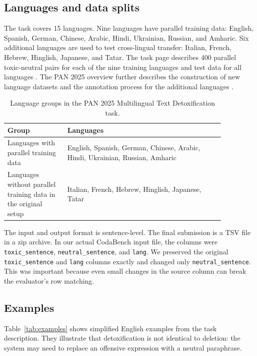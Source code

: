 \documentclass{article}
\begin{document}
\subsection{Languages and data splits}

The task covers 15 languages. Nine languages have parallel training data: English, Spanish, German, Chinese, Arabic, Hindi, Ukrainian, Russian, and Amharic. Six additional languages are used to test cross-lingual transfer: Italian, French, Hebrew, Hinglish, Japanese, and Tatar. The task page describes 400 parallel toxic-neutral pairs for each of the nine training languages and test data for all languages \cite{pan25taskpage}. The PAN 2025 overview further describes the construction of new language datasets and the annotation process for the additional languages \cite{dementieva2025pantextdetox}.

\begin{table}[tbh!]
\centering
\begin{tabular}{p{0.24\linewidth}p{0.63\linewidth}}
\toprule
Group & Languages \\
\midrule
Languages with parallel training data & English, Spanish, German, Chinese, Arabic, Hindi, Ukrainian, Russian, Amharic \\
Languages without parallel training data in the original setup & Italian, French, Hebrew, Hinglish, Japanese, Tatar \\
\bottomrule
\end{tabular}
\caption{Language groups in the PAN 2025 Multilingual Text Detoxification task.}
\label{tab:languages}
\end{table}

The input and output format is sentence-level. The final submission is a TSV file in a zip archive. In our actual CodaBench input file, the columns were \texttt{toxic\_sentence}, \texttt{neutral\_sentence}, and \texttt{lang}. We preserved the original \texttt{toxic\_sentence} and \texttt{lang} columns exactly and changed only \texttt{neutral\_sentence}. This was important because even small changes in the source column can break the evaluator's row matching.

\subsection{Examples}

Table~\ref{tab:examples} shows simplified English examples from the task description. They illustrate that detoxification is not identical to deletion: the system may need to replace an offensive expression with a neutral paraphrase.
\end{document}
